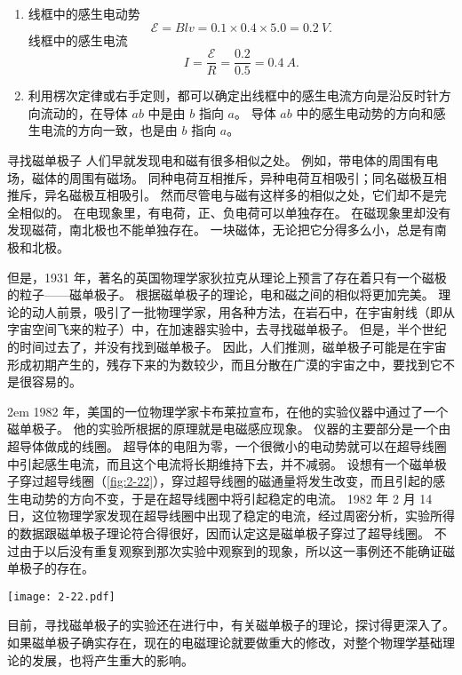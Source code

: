 \begin{solution}
\begin{enumerate}
    \item 线框中的感生电动势
\[\mathcal{E}=Blv=0.1\times0.4\times5.0=\qty{0.2}{V}.\]    
线框中的感生电流
\[I=\frac{\mathcal{E}}{R}=\frac{0.2}{0.5}=\qty{0.4}{A}.\]

\item 利用楞次定律或右手定则，都可以确定出线框中的感生电流方向是沿反时针方向流动的，在导体 $ab$ 中是由 $b$ 指向 $a$。 导体 $ab$ 中的感生电动势的方向和感生电流的方向一致，也是由 $b$ 指向 $a$。
\end{enumerate}
\end{solution}
   
\begin{Reading}{寻找磁单极子}
人们早就发现电和磁有很多相似之处。
例如，带电体的周围有电场，磁体的周围有磁场。
同种电荷互相推斥，异种电荷互相吸引；同名磁极互相推斥，异名磁极互相吸引。
然而尽管电与磁有这样多的相似之处，它们却不是完全相似的。
在电现象里，有电荷，正、负电荷可以单独存在。
在磁现象里却没有发现磁荷，南北极也不能单独存在。
一块磁体，无论把它分得多么小，总是有南极和北极。

但是，1931 年，著名的英国物理学家狄拉克从理论上预言了存在着只有一个磁极的粒子——磁单极子。
根据磁单极子的理论，电和磁之间的相似将更加完美。
理论的动人前景，吸引了一批物理学家，用各种方法，在岩石中，在宇宙射线（即从字宙空间飞来的粒子）中，在加速器实验中，去寻找磁单极子。
但是，半个世纪的时间过去了，并没有找到磁单极子。
因此，人们推测，磁单极子可能是在宇宙形成初期产生的，残存下来的为数较少，而且分散在广漠的宇宙之中，要找到它不是很容易的。

\medskip\noindent
\begin{minipage}{0.72\linewidth}\parindent2em
1982 年，美国的一位物理学家卡布莱拉宣布，在他的实验仪器中通过了一个磁单极子。
他的实验所根据的原理就是电磁感应现象。
仪器的主要部分是一个由超导体做成的线圈。
超导体的电阻为零，一个很微小的电动势就可以在超导线圈中引起感生电流，而且这个电流将长期维持下去，并不减弱。
设想有一个磁单极子穿过超导线圈（\cref{fig:2-22}），穿过超导线圈的磁通量将发生改变，而且引起的感生电动势的方向不变，于是在超导线圈中将引起稳定的电流。
1982 年 2 月 14 日，这位物理学家发现在超导线圈中出现了稳定的电流，经过周密分析，实验所得的数据跟磁单极子理论符合得很好，因而认定这是磁单极子穿过了超导线圈。
不过由于以后没有重复观察到那次实验中观察到的现象，所以这一事例还不能确证磁单极子的存在。
\end{minipage}\hfill
\begin{minipage}{0.23\linewidth}\centering
  \begin{figurehere}
    \begin{minipage}{\linewidth}\centering
      \texttt{[image: 2-22.pdf]}
      \caption{}\label{fig:2-22}
    \end{minipage}
  \end{figurehere}
\end{minipage}

\medskip
目前，寻找磁单极子的实验还在进行中，有关磁单极子的理论，探讨得更深入了。
如果磁单极子确实存在，现在的电磁理论就要做重大的修改，对整个物理学基础理论的发展，也将产生重大的影响。
\end{Reading}

